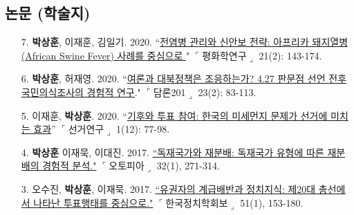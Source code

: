 \documentclass[11pt]{res} %
\begin{document}
\begin{resume}
\section{논문 (학술지)} 
\begin{enumerate}[leftmargin=*]
	\item[7.] \textbf{박상훈}, 이재훈, 김일기. 2020. ``\href{http://www.earticle.net/Article/A378721}{전염병 관리와 신안보 전략: 아프리카 돼지열병(African Swine Fever) 사례를 중심으로 }" $\ulcorner$평화학연구$\lrcorner$ 21(2): 143-174.
	\item[6.] \textbf{박상훈}, 허재영. 2020. ``\href{journal.kstudy.com/ISS_DownLoad.asp?a_code=0g000726.pdf&inst=3345&isDownLoad=1&code=YqldZWtoSqVtJTNEMnMoNSUmN/B Z xLJTNEVHJpZQ==}{여론과 대북정책은 조응하는가? 4.27 판문점 선언 전후 국민의식조사의 경험적 연구}." $\ulcorner$담론201$\lrcorner$ 23(2): 83-113.
	\item[5.] 이재훈, \textbf{박상훈}. 2020. ``\href{https://m.nec.go.kr/portal/cmm/fms/FileDown.do?atchFileId=5d0ffae936edc42f3b4e864801f86a0f4096c44da03fede418b94067e8f9d0ea&fileSn=1&bbsId=&searchYear=}{기후와 투표 참여: 한국의 미세먼지 문제가 선거에 미치는 효과}''  $\ulcorner$선거연구$\lrcorner$ 1(12): 77-98.  
	\item[4.] \textbf{박상훈} 이재묵, 이대진. 2017. \href{http://www.dbpia.co.kr/Journal/ArticleDetail/NODE07183479?TotalCount=1&Seq=1&q=%5B%EB%8F%85%EC%9E%AC%EA%B5%AD%EA%B0%80%EC%99%80%20%EC%9E%AC%EB%B6%84%EB%B0%B0%C2%A7coldb%C2%A72%C2%A751%C2%A73%5D&searchWord=%EC%A0%84%EC%B2%B4%3D%5E%24%EB%8F%85%EC%9E%AC%EA%B5%AD%EA%B0%80%EC%99%80%20%EC%9E%AC%EB%B6%84%EB%B0%B0%5E*&Multimedia=0&isIdentifyAuthor=0&Collection=0&SearchAll=%EB%8F%85%EC%9E%AC%EA%B5%AD%EA%B0%80%EC%99%80%20%EC%9E%AC%EB%B6%84%EB%B0%B0&isFullText=0&specificParam=0&SearchMethod=0&Sort=1&SortType=desc&Page=1&PageSize=20#}{``독재국가와 재분배: 독재국가 유형에 따른 재분배의 경험적 분석."}  $\ulcorner$오토피아$\lrcorner$ 32(1), 271-314.
	\item[3.] 오수진, \textbf{박상훈}, 이재묵. 2017. \href{http://www.dbpia.co.kr/Journal/ArticleDetail/NODE07131578?TotalCount=1&Seq=1&q=%5B%EC%9D%B4%EC%9E%AC%EB%AC%B5%20%EC%98%A4%EC%88%98%EC%A7%84%20%EB%B0%95%EC%83%81%ED%9B%88%20%EA%B3%84%EA%B8%89%ED%88%AC%ED%91%9C%C2%A7coldb%C2%A72%C2%A751%C2%A73%5D&searchWord=%EC%A0%84%EC%B2%B4%3D%5E%24%EC%9D%B4%EC%9E%AC%EB%AC%B5%20%EC%98%A4%EC%88%98%EC%A7%84%20%EB%B0%95%EC%83%81%ED%9B%88%20%EA%B3%84%EA%B8%89%ED%88%AC%ED%91%9C%5E*&Multimedia=0&isIdentifyAuthor=0&Collection=0&SearchAll=%EC%9D%B4%EC%9E%AC%EB%AC%B5%20%EC%98%A4%EC%88%98%EC%A7%84%20%EB%B0%95%EC%83%81%ED%9B%88%20%EA%B3%84%EA%B8%89%ED%88%AC%ED%91%9C&isFullText=0&specificParam=0&SearchMethod=0&Sort=1&SortType=desc&Page=1&PageSize=20#}{``유권자의 계급배반과 정치지식: 제20대 총선에서 나타난 투표행태를 중심으로."} $\ulcorner$한국정치학회보$\lrcorner$ 51(1), 153-180.

\end{enumerate}
\end{resume}
\end{document}
